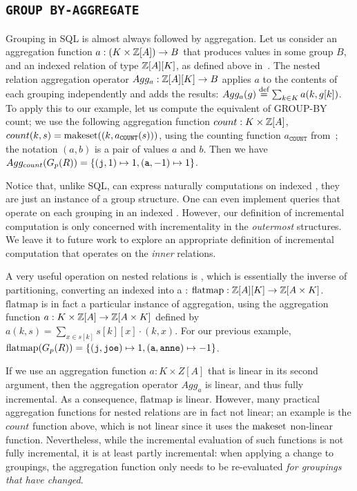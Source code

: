 \subsection{\texttt{GROUP BY-AGGREGATE}}

Grouping in SQL is almost always followed by aggregation.  
Let us consider an aggregation function $a: (K \times \mathbb{Z}[A]) \to B$ that produces values
in some group $B$, and an indexed relation of type $\mathbb{Z}[A][K]$, as defined above in~.
The nested relation aggregation operator $Agg_a: \mathbb{Z}[A][K] \to B$ applies $a$ 
to the contents of each grouping independently and adds the results:
$Agg_a(g) \stackrel{\textrm{\scriptsize def}}{=} \sum_{k \in K} a(k, g[k])$.  To apply this
to our example, let us compute the equivalent of GROUP-BY count; we use
the following aggregation function $count: K \times \mathbb{Z}[A]$, $count(k, s) = 
\mbox{makeset}((k, a_\texttt{COUNT}(s)))$, using the \zr counting function $a_\texttt{COUNT}$ 
from~; the notation $(a,b)$ is a pair of values $a$ and $b$.
Then we have $Agg_{count} (G_p(R)) = \{ (\mbox{\texttt{j}}, 1) \mapsto 1, 
(\mbox{\texttt{a}}, -1) \mapsto 1 \}$.

Notice that, unlike SQL, \dbsp can express naturally computations
on indexed \zrs, they are just an instance of a group structure. 
One can even implement queries that operate on each grouping 
in an indexed \zr.  However, our definition of incremental 
computation is only concerned with incrementality in the 
\emph{outermost} structures.  We leave it to future work to
explore an appropriate definition of incremental computation that
operates on the \emph{inner} relations.

A very useful operation on nested relations is , which is
essentially the inverse of partitioning, converting an indexed
\zr into a \zr: $\mbox{flatmap}: \mathbb{Z}[A][K] \to \mathbb{Z}[A \times K]$.
$\mbox{flatmap}$ is in fact a particular instance of aggregation,
using the aggregation function $a: K \times \mathbb{Z}[A] \to \mathbb{Z}[A \times K]$
defined by $a(k, s) = \sum_{x \in s[k]} s[k][x] \cdot (k, x).$
For our previous example, $\mbox{flatmap}(G_p(R)) = \{ (\mbox{\texttt{j}}, \mbox{\texttt{joe}}) \mapsto 1, 
(\mbox{\texttt{a}}, \mbox{\texttt{anne}}) \mapsto -1 \}$.

If we use an aggregation function $a: K \times Z[A]$ that is linear in its
second argument, then the aggregation operator $Agg_a$ is linear, and
thus fully incremental.  As a consequence, $\mbox{flatmap}$ is linear.  
However, many practical aggregation functions for nested relations are in fact 
not linear; an example is the $count$ function above, which is not linear
since it uses the $\mbox{makeset}$ non-linear function.  Nevertheless, while 
the incremental evaluation of such functions is not fully incremental, 
it is at least partly incremental: when applying a change to groupings, the aggregation 
function only needs to be re-evaluated \emph{for groupings that have changed}.

